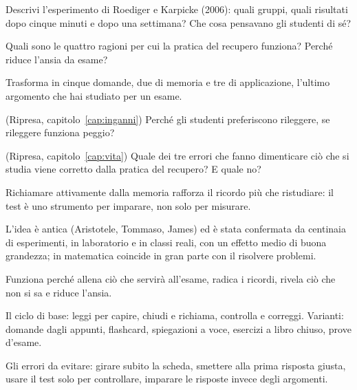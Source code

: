 \begin{domande}
  \item Descrivi l'esperimento di Roediger e Karpicke (2006): quali
        gruppi, quali risultati dopo cinque minuti e dopo una
        settimana? Che cosa pensavano gli studenti di sé?
  \item Quali sono le quattro ragioni per cui la pratica del recupero
        funziona? Perché riduce l'ansia da esame?
  \item Trasforma in cinque domande, due di memoria e tre di
        applicazione, l'ultimo argomento che hai studiato per un esame.
  \item (Ripresa, capitolo~\ref{cap:inganni}) Perché gli studenti
        preferiscono rileggere, se rileggere funziona peggio?
  \item (Ripresa, capitolo~\ref{cap:vita}) Quale dei tre errori che
        fanno dimenticare ciò che si studia viene corretto dalla
        pratica del recupero? E quale no?
\end{domande}

\begin{sintesi}
  \item Richiamare attivamente dalla memoria rafforza il ricordo più
        che ristudiare: il test è uno strumento per imparare, non solo
        per misurare.
  \item L'idea è antica (Aristotele, Tommaso, James) ed è stata
        confermata da centinaia di esperimenti, in laboratorio e in
        classi reali, con un effetto medio di buona grandezza; in
        matematica coincide in gran parte con il risolvere problemi.
  \item Funziona perché allena ciò che servirà all'esame, radica i
        ricordi, rivela ciò che non si sa e riduce l'ansia.
  \item Il ciclo di base: leggi per capire, chiudi e richiama, controlla
        e correggi. Varianti: domande dagli appunti, flashcard,
        spiegazioni a voce, esercizi a libro chiuso, prove d'esame.
  \item Gli errori da evitare: girare subito la scheda, smettere alla
        prima risposta giusta, usare il test solo per controllare,
        imparare le risposte invece degli argomenti.
\end{sintesi}

\finecapitolo
